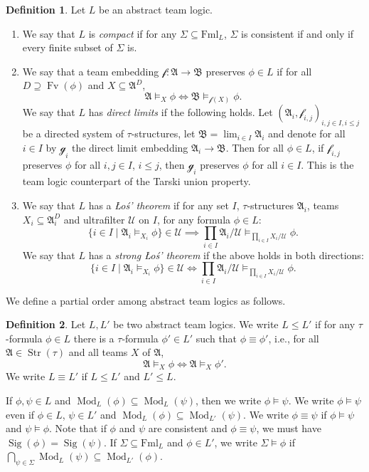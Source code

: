 \documentclass[a4paper]{amsart}
\theoremstyle{definition}
\newtheorem{definition}{Definition}[section]
\theoremstyle{remark}
\newcommand{\A}{\mathcal{A}}
\newcommand{\B}{\mathcal{B}}
\newcommand{\U}{\mathcal{U}}
\DeclareMathOperator{\Fv}{Fv}
\theoremstyle{definition}
\renewcommand{\A}{\mathfrak{A}}
\renewcommand{\B}{\mathfrak{B}}
\DeclareMathOperator{\Str}{Str}
\DeclareMathOperator{\Sig}{Sig}
\newcommand{\Fml}{\mathrm{Fml}_L}
\DeclareMathOperator{\Mod}{Mod}
\newcommand{\f}{\mathcal{f}}
\newcommand{\g}{\mathcal{g}}
\begin{document}
\begin{definition}
    Let $L$ be an abstract team logic.
    \begin{enumerate}
        \item We say that $L$ is \emph{compact} if for any $\Sigma\subseteq\Fml$, $\Sigma$ is consistent if and only if every finite subset of $\Sigma$ is.

        \item We say that a team embedding $\f\colon\A\to\B$ preserves $\phi\in L$ if for all $D\supseteq\Fv(\phi)$ and $X\subseteq\A^D$,
        \[
            \A\models_{X}\phi \iff \B\models_{\f(X)}\phi.
        \]
        We say that $L$ has \emph{direct limits} if the following holds. Let $(\A_i,\f_{i,j})_{i,j\in I,i\leq j}$ be a directed system of $\tau$-structures, let $\B = \lim_{i\in I}\A_i$ and denote for all $i\in I$ by $\g_i$ the direct limit embedding $\A_i\to\B$. Then for all $\phi\in L$, if $\f_{i,j}$ preserves $\phi$ for all $i,j\in I$, $i\leq j$, then $\g_i$ preserves $\phi$ for all $i\in I$. This is the team logic counterpart of the Tarski union property.

        \item We say that $L$ has a \emph{Łoś' theorem} if for any set $I$, $\tau$-structures $\A_i$, teams $X_i\subseteq \A_i^D$ and ultrafilter $\U$ on $I$, for any formula $\phi\in L$:
        \[
    		\{i\in I \mid \A_i\models_{X_i}\phi\}\in\U \implies \prod_{i\in I} \A_i/\U \models_{\prod_{i\in I} X_i/\U } \phi.
		\]
        We say that $L$ has a \emph{strong Łoś' theorem} if the above holds in both directions:
		\[
    		\{i\in I \mid \A_i\models_{X_i}\phi\}\in\U \iff \prod_{i\in I} \A_i/ \U \models_{\prod_{i\in I} X_i/ \U } \phi.
		\]        
    \end{enumerate}
\end{definition}

We define a partial order among abstract team logics as follows.
\begin{definition}
    Let $L,L'$ be two abstract team logics. We write $L\leq L'$ if for any $\tau$-formula $\phi\in L$ there is a $\tau$-formula $\phi'\in L'$ such that $\phi\equiv\phi'$, i.e., for all $\A\in\Str(\tau)$ and all teams $X$ of $\A$,
    \[
        \A\models_X\phi \iff \A\models_X\phi'.
    \]
    We write $L\equiv L'$ if $L\leq L'$ and $L'\leq L$.
\end{definition}

If $\phi,\psi\in L$ and $\Mod_L(\phi) \subseteq \Mod_L(\psi)$, then we write $\phi\models\psi$. We write $\phi\models\psi$ even if $\phi\in L$, $\psi\in L'$ and $\Mod_L(\phi) \subseteq \Mod_{L'}(\psi)$. We write $\phi\equiv\psi$ if $\phi\models\psi$ and $\psi\models\phi$. Note that if $\phi$ and $\psi$ are consistent and $\phi\equiv\psi$, we must have $\Sig(\phi) = \Sig(\psi)$. If $\Sigma\subseteq\Fml$ and $\phi\in L'$, we write $\Sigma\models\phi$ if $\bigcap_{\psi\in\Sigma}\Mod_L(\psi)\subseteq\Mod_{L'}(\phi)$.
\end{document}
